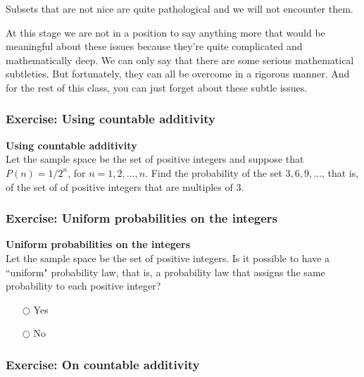 \documentclass[pdftex, brazil, 12pt, twoside]{article}
\begin{document}
Subsets that are not nice are quite pathological and we will
not encounter them.

At this stage we are not in a position to say anything more
that would be meaningful about these issues because they're
quite complicated and mathematically deep.
We can only say that there are some serious mathematical
subtleties.
But fortunately, they can all be overcome
in a rigorous manner.
And for the rest of this class, you can just forget
about these subtle issues.

\subsubsection{Exercise: Using countable additivity}
\label{un1-lec1-exec-using-countable-additivity}

\begin{exercise}
  \textbf{Using countable additivity}\\
  Let the sample space be the set of positive integers and suppose that $P(n)=1/2^n$,
  for $n=1,2,\ldots, n$. Find the probability of the set ${3, 6, 9, \ldots}$, that is,
  of the set of of positive integers that are multiples of 3.
\end{exercise}

\subsubsection{Exercise: Uniform probabilities on the integers}
\label{un1-lec1-exec-unif-prob-integers}

\begin{exercise}
  \textbf{Uniform probabilities on the integers}\\
  Let the sample space be the set of positive integers. Is it possible to have a
  “uniform" probability law, that is, a probability law that assigns the same
  probability to each positive integer?

  \begin{itemize}[noitemsep]
  \item[$\bigcirc$] Yes
  \item[$\bigcirc$] No
  \end{itemize}
\end{exercise}

\subsubsection{Exercise: On countable additivity}
\label{un1-lec1-exec-cont-additivity}
\end{document}
